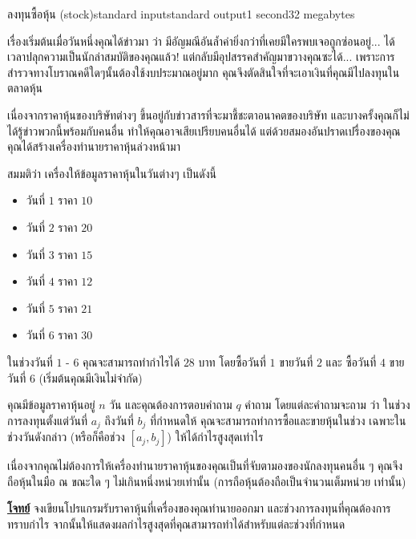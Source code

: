 \documentclass[11pt,a4paper]{article}
\begin{document}
\begin{problem}{ลงทุนซื้อหุ้น (stock)}{standard input}{standard output}{1 second}{32 megabytes}

    เรื่องเริ่มต้นเมื่อวันหนึ่งคุณได้ข่าวมา ว่า มีอัญมณีอันล้ำค่ายิ่งกว่าที่เคยมีใครพบเจอถูกซ่อนอยู่... ได้เวลาปลุกความเป็นนักล่าสมบัติของคุณแล้ว! แต่กลับมีอุปสรรคสำคัญมาขวางคุณซะได้... เพราะการสำรวจทางโบราณคดีใดๆนั้นต้องใช้งบประมาณอยู่มาก คุณจึงตัดสินใจที่จะเอาเงินที่คุณมีไปลงทุนในตลาดหุ้น

        เนื่องจากราคาหุ้นของบริษัทต่างๆ ขึ้นอยู่กับข่าวสารที่จะมาชี้ชะตาอนาคตของบริษัท และบางครั้งคุณก็ไม่ได้รู้ข่าวพวกนี้พร้อมกับคนอื่น ทำให้คุณอาจเสียเปรียบคนอื่นได้ แต่ด้วยสมองอันปราดเปรื่องของคุณ คุณได้สร้างเครื่องทำนายราคาหุ้นล่วงหน้ามา

สมมติว่า เครื่องให้ข้อมูลราคาหุ้นในวันต่างๆ เป็นดังนี้

\begin{itemize}

		 \item วันที่ $1$ ราคา $10$
         \item วันที่ $2$ ราคา $20$
         \item วันที่ $3$ ราคา $15$
         \item วันที่ $4$ ราคา $12$
         \item วันที่ $5$ ราคา $21$
         \item วันที่ $6$ ราคา $30$

\end{itemize}


        ในช่วงวันที่ $1$ - $6$ คุณจะสามารถทำกำไรได้ $28$ บาท โดยซื้อวันที่ $1$ ขายวันที่ $2$ และ ซื้อวันที่ $4$ ขายวันที่ $6$ (เริ่มต้นคุณมีเงินไม่จำกัด)

         คุณมีข้อมูลราคาหุ้นอยู่ $n$ วัน และคุณต้องการตอบคำถาม $q$ คำถาม โดยแต่ละคำถามจะถาม
ว่า ในช่วงการลงทุนตั้งแต่วันที่ $a_j$ ถึงวันที่ $b_j$ ที่กำหนดให้ คุณจะสามารถทำการซื้อและขายหุ้นในช่วง
เฉพาะในช่วงวันดังกล่าว (หรือก็คือช่วง $[a_j, b_j]$) ให้ได้กำไรสูงสุดเท่าไร

        เนื่องจากคุณไม่ต้องการให้เครื่องทำนายราคาหุ้นของคุณเป็นที่จับตามองของนักลงทุนคนอื่น ๆ
คุณจึงถือหุ้นในมือ ณ ขณะใด ๆ ไม่เกินหนึ่งหน่วยเท่านั้น (การถือหุ้นต้องถือเป็นจำนวนเต็มหน่วย
เท่านั้น)

\bigskip
\underline{\textbf{โจทย์}}  จงเขียนโปรแกรมรับราคาหุ้นที่เครื่องของคุณทำนายออกมา และช่วงการลงทุนที่คุณต้องการทราบกำไร จากนั้นให้แสดงผลกำไรสูงสุดที่คุณสามารถทำได้สำหรับแต่ละช่วงที่กำหนด

\InputFile


\end{problem}
\end{document}

